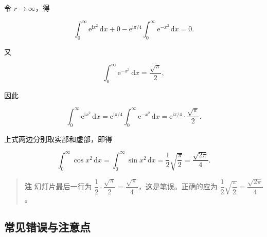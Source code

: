 令 \(r\to\infty\)，得

\[
\int_{0}^{\infty}\mathrm e^{\mathrm i x^{2}}\,\mathrm dx
+0-\mathrm e^{\mathrm i\pi/4}\int_{0}^{\infty}\mathrm e^{-x^{2}}\,\mathrm dx=0 .
\]

又

\[
\int_{0}^{\infty}\mathrm e^{-x^{2}}\,\mathrm dx=\frac{\sqrt\pi}{2},
\]

因此

\[
\int_{0}^{\infty}\mathrm e^{\mathrm i x^{2}}\,\mathrm dx
=\mathrm e^{\mathrm i\pi/4}\int_{0}^{\infty}\mathrm e^{-x^{2}}\,\mathrm dx
=\mathrm e^{\mathrm i\pi/4}\cdot\frac{\sqrt\pi}{2}.
\]

上式两边分别取实部和虚部，即得

\[
\boxed{\displaystyle\int_{0}^{\infty}\cos x^{2}\,\mathrm dx
=\int_{0}^{\infty}\sin x^{2}\,\mathrm dx
=\frac{1}{2}\sqrt{\frac{\pi}{2}}
=\frac{\sqrt{2\pi}}{4}} .
\]

\begin{quote}
\textbf{注} 幻灯片最后一行为
\(\dfrac12\cdot\dfrac{\sqrt\pi}{2}=\dfrac{\sqrt\pi}{4}\)，这是笔误。正确的应为
\(\dfrac12\sqrt{\dfrac{\pi}{2}}=\dfrac{\sqrt{2\pi}}{4}\)。
\end{quote}

\subsection{常见错误与注意点}\label{ux5e38ux89c1ux9519ux8befux4e0eux6ce8ux610fux70b9-13}

